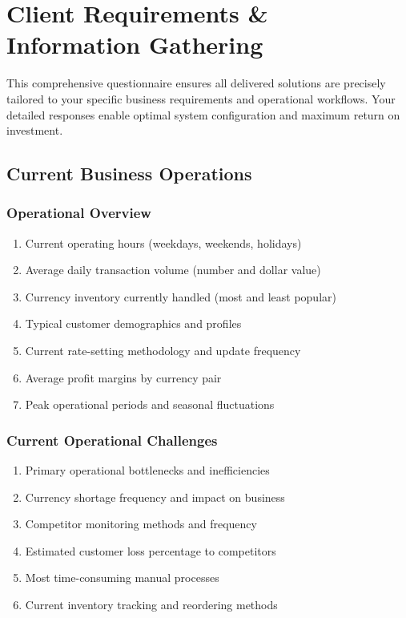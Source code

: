 \documentclass[11pt, letterpaper]{article}
\begin{document}
\newpage

\section{Client Requirements \& Information Gathering}

\begin{tcolorbox}[colback=warningOrange!10, colframe=warningOrange, title=\textbf{Essential Information for Optimal System Design}]
This comprehensive questionnaire ensures all delivered solutions are precisely tailored to your specific business requirements and operational workflows. Your detailed responses enable optimal system configuration and maximum return on investment.
\end{tcolorbox}

\subsection{Current Business Operations}

\subsubsection{Operational Overview}
\begin{enumerate}[leftmargin=*]
    \item Current operating hours (weekdays, weekends, holidays)
    \item Average daily transaction volume (number and dollar value)
    \item Currency inventory currently handled (most and least popular)
    \item Typical customer demographics and profiles
    \item Current rate-setting methodology and update frequency
    \item Average profit margins by currency pair
    \item Peak operational periods and seasonal fluctuations
\end{enumerate}

\subsubsection{Current Operational Challenges}
\begin{enumerate}[leftmargin=*]
    \item Primary operational bottlenecks and inefficiencies
    \item Currency shortage frequency and impact on business
    \item Competitor monitoring methods and frequency
    \item Estimated customer loss percentage to competitors
    \item Most time-consuming manual processes
    \item Current inventory tracking and reordering methods
\end{enumerate}
\end{document}
